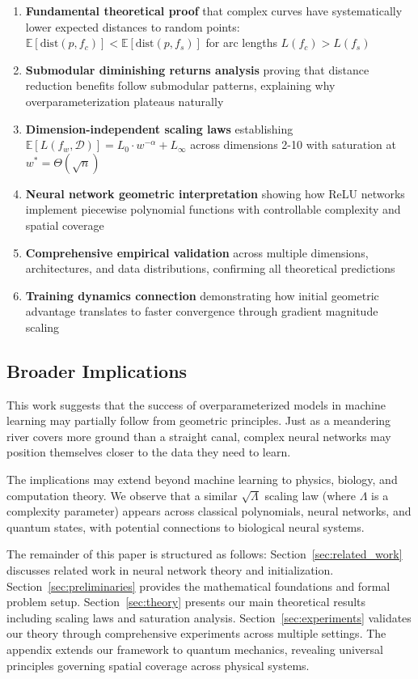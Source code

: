\begin{enumerate}
    \item \textbf{Fundamental theoretical proof} that complex curves have systematically lower expected distances to random points: $\mathbb{E}[\text{dist}(p, f_c)] < \mathbb{E}[\text{dist}(p, f_s)]$ for arc lengths $L(f_c) > L(f_s)$
    \item \textbf{Submodular diminishing returns analysis} proving that distance reduction benefits follow submodular patterns, explaining why overparameterization plateaus naturally
    \item \textbf{Dimension-independent scaling laws} establishing $\mathbb{E}[L(f_w, \mathcal{D})] = L_0 \cdot w^{-\alpha} + L_\infty$ across dimensions 2-10 with saturation at $w^* = \Theta(\sqrt{n})$
    \item \textbf{Neural network geometric interpretation} showing how ReLU networks implement piecewise polynomial functions with controllable complexity and spatial coverage
    \item \textbf{Comprehensive empirical validation} across multiple dimensions, architectures, and data distributions, confirming all theoretical predictions
    \item \textbf{Training dynamics connection} demonstrating how initial geometric advantage translates to faster convergence through gradient magnitude scaling
\end{enumerate}

\subsection{Broader Implications}

This work suggests that the success of overparameterized models in machine learning may partially follow from geometric principles. Just as a meandering river covers more ground than a straight canal, complex neural networks may position themselves closer to the data they need to learn.

The implications may extend beyond machine learning to physics, biology, and computation theory. We observe that a similar $\sqrt{\Lambda}$ scaling law (where $\Lambda$ is a complexity parameter) appears across classical polynomials, neural networks, and quantum states, with potential connections to biological neural systems.

The remainder of this paper is structured as follows: Section~\ref{sec:related_work} discusses related work in neural network theory and initialization. Section~\ref{sec:preliminaries} provides the mathematical foundations and formal problem setup. Section~\ref{sec:theory} presents our main theoretical results including scaling laws and saturation analysis. Section~\ref{sec:experiments} validates our theory through comprehensive experiments across multiple settings. The appendix extends our framework to quantum mechanics, revealing universal principles governing spatial coverage across physical systems.
